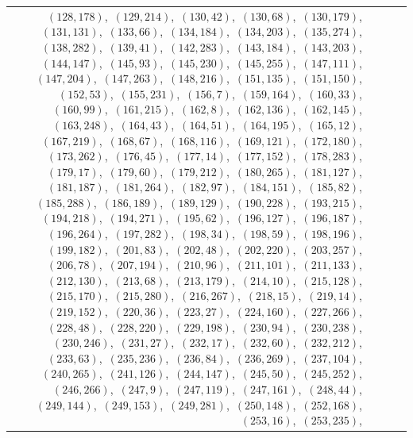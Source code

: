 \documentclass[11pt]{article}
\begin{document}
\begin{longtable}{@{}rrl>{\raggedright\arraybackslash}p{}@{}}
$(128,178)$,\allowbreak\ $(129,214)$,\allowbreak\ $(130,42)$,\allowbreak\ $(130,68)$,\allowbreak\ $(130,179)$,\allowbreak\ $(131,131)$,\allowbreak\ $(133,66)$,\allowbreak\ $(134,184)$,\allowbreak\ $(134,203)$,\allowbreak\ $(135,274)$,\allowbreak\ $(138,282)$,\allowbreak\ $(139,41)$,\allowbreak\ $(142,283)$,\allowbreak\ $(143,184)$,\allowbreak\ $(143,203)$,\allowbreak\ $(144,147)$,\allowbreak\ $(145,93)$,\allowbreak\ $(145,230)$,\allowbreak\ $(145,255)$,\allowbreak\ $(147,111)$,\allowbreak\ $(147,204)$,\allowbreak\ $(147,263)$,\allowbreak\ $(148,216)$,\allowbreak\ $(151,135)$,\allowbreak\ $(151,150)$,\allowbreak\ $(152,53)$,\allowbreak\ $(155,231)$,\allowbreak\ $(156,7)$,\allowbreak\ $(159,164)$,\allowbreak\ $(160,33)$,\allowbreak\ $(160,99)$,\allowbreak\ $(161,215)$,\allowbreak\ $(162,8)$,\allowbreak\ $(162,136)$,\allowbreak\ $(162,145)$,\allowbreak\ $(163,248)$,\allowbreak\ $(164,43)$,\allowbreak\ $(164,51)$,\allowbreak\ $(164,195)$,\allowbreak\ $(165,12)$,\allowbreak\ $(167,219)$,\allowbreak\ $(168,67)$,\allowbreak\ $(168,116)$,\allowbreak\ $(169,121)$,\allowbreak\ $(172,180)$,\allowbreak\ $(173,262)$,\allowbreak\ $(176,45)$,\allowbreak\ $(177,14)$,\allowbreak\ $(177,152)$,\allowbreak\ $(178,283)$,\allowbreak\ $(179,17)$,\allowbreak\ $(179,60)$,\allowbreak\ $(179,212)$,\allowbreak\ $(180,265)$,\allowbreak\ $(181,127)$,\allowbreak\ $(181,187)$,\allowbreak\ $(181,264)$,\allowbreak\ $(182,97)$,\allowbreak\ $(184,151)$,\allowbreak\ $(185,82)$,\allowbreak\ $(185,288)$,\allowbreak\ $(186,189)$,\allowbreak\ $(189,129)$,\allowbreak\ $(190,228)$,\allowbreak\ $(193,215)$,\allowbreak\ $(194,218)$,\allowbreak\ $(194,271)$,\allowbreak\ $(195,62)$,\allowbreak\ $(196,127)$,\allowbreak\ $(196,187)$,\allowbreak\ $(196,264)$,\allowbreak\ $(197,282)$,\allowbreak\ $(198,34)$,\allowbreak\ $(198,59)$,\allowbreak\ $(198,196)$,\allowbreak\ $(199,182)$,\allowbreak\ $(201,83)$,\allowbreak\ $(202,48)$,\allowbreak\ $(202,220)$,\allowbreak\ $(203,257)$,\allowbreak\ $(206,78)$,\allowbreak\ $(207,194)$,\allowbreak\ $(210,96)$,\allowbreak\ $(211,101)$,\allowbreak\ $(211,133)$,\allowbreak\ $(212,130)$,\allowbreak\ $(213,68)$,\allowbreak\ $(213,179)$,\allowbreak\ $(214,10)$,\allowbreak\ $(215,128)$,\allowbreak\ $(215,170)$,\allowbreak\ $(215,280)$,\allowbreak\ $(216,267)$,\allowbreak\ $(218,15)$,\allowbreak\ $(219,14)$,\allowbreak\ $(219,152)$,\allowbreak\ $(220,36)$,\allowbreak\ $(223,27)$,\allowbreak\ $(224,160)$,\allowbreak\ $(227,266)$,\allowbreak\ $(228,48)$,\allowbreak\ $(228,220)$,\allowbreak\ $(229,198)$,\allowbreak\ $(230,94)$,\allowbreak\ $(230,238)$,\allowbreak\ $(230,246)$,\allowbreak\ $(231,27)$,\allowbreak\ $(232,17)$,\allowbreak\ $(232,60)$,\allowbreak\ $(232,212)$,\allowbreak\ $(233,63)$,\allowbreak\ $(235,236)$,\allowbreak\ $(236,84)$,\allowbreak\ $(236,269)$,\allowbreak\ $(237,104)$,\allowbreak\ $(240,265)$,\allowbreak\ $(241,126)$,\allowbreak\ $(244,147)$,\allowbreak\ $(245,50)$,\allowbreak\ $(245,252)$,\allowbreak\ $(246,266)$,\allowbreak\ $(247,9)$,\allowbreak\ $(247,119)$,\allowbreak\ $(247,161)$,\allowbreak\ $(248,44)$,\allowbreak\ $(249,144)$,\allowbreak\ $(249,153)$,\allowbreak\ $(249,281)$,\allowbreak\ $(250,148)$,\allowbreak\ $(252,168)$,\allowbreak\ $(253,16)$,\allowbreak\ $(253,235)$,\allowbreak\ 
\end{longtable}
\end{document}
